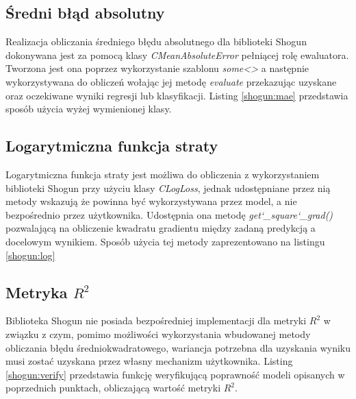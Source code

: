 
\subsection{Średni błąd absolutny}

Realizacja obliczania średniego błędu absolutnego dla biblioteki Shogun dokonywana jest za pomocą klasy \textit{CMeanAbsoluteError} pełniącej rolę ewaluatora. Tworzona jest ona poprzez wykorzystanie szablonu \textit{some<>} a następnie wykorzystywana do obliczeń wołając jej metodę \textit{evaluate} przekazując uzyskane oraz oczekiwane wyniki regresji lub klasyfikacji. Listing \ref{shogun:mae} przedstawia sposób użycia wyżej wymienionej klasy.


\subsection{Logarytmiczna funkcja straty}

Logarytmiczna funkcja straty jest możliwa do obliczenia z wykorzystaniem biblioteki Shogun przy użyciu klasy \textit{CLogLoss}, jednak udostępniane przez nią metody wskazują że powinna być wykorzystywana przez model, a nie bezpośrednio przez użytkownika. Udostępnia ona metodę \textit{get\char`_square\char`_grad()} pozwalającą na obliczenie kwadratu gradientu między zadaną predykcją a docelowym wynikiem. Sposób użycia tej metody zaprezentowano na listingu \ref{shogun:log}


\subsection{Metryka $R^2$}

Biblioteka Shogun nie posiada bezpośredniej implementacji dla metryki $R^2$ w związku z czym, pomimo możliwości wykorzystania wbudowanej metody obliczania błędu średniokwadratowego, wariancja potrzebna dla uzyskania wyniku musi zostać uzyskana przez własny mechanizm użytkownika. Listing \ref{shogun:verify} przedstawia funkcję weryfikującą poprawność modeli opisanych w poprzednich punktach, obliczającą wartość metryki $R^2$.

